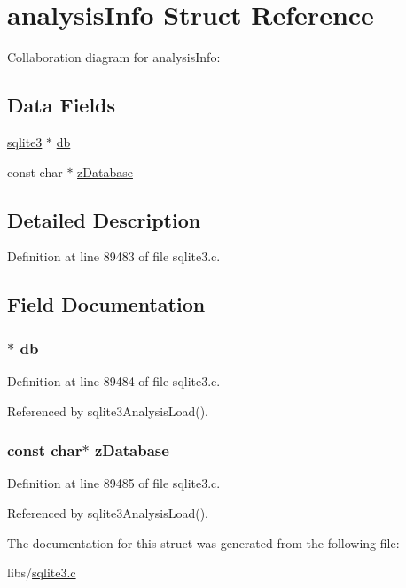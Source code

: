 \hypertarget{structanalysis_info}{}\section{analysis\+Info Struct Reference}
\label{structanalysis_info}


Collaboration diagram for analysis\+Info\+:
\subsection*{Data Fields}
\begin{DoxyCompactItemize}
\item 
\hyperlink{structsqlite3}{sqlite3} $\ast$ \hyperlink{structanalysis_info_ad6e663497d2c934364b3bcf07496b30b}{db}
\item 
const char $\ast$ \hyperlink{structanalysis_info_a40b092a9a3228020178e32c8c3bffdf5}{z\+Database}
\end{DoxyCompactItemize}


\subsection{Detailed Description}


Definition at line 89483 of file sqlite3.\+c.



\subsection{Field Documentation}
\hypertarget{structanalysis_info_ad6e663497d2c934364b3bcf07496b30b}{}
\subsubsection[{db}]{$\ast$ db}\label{structanalysis_info_ad6e663497d2c934364b3bcf07496b30b}


Definition at line 89484 of file sqlite3.\+c.



Referenced by sqlite3\+Analysis\+Load().

\hypertarget{structanalysis_info_a40b092a9a3228020178e32c8c3bffdf5}{}
\subsubsection[{z\+Database}]{\setlength{\rightskip}{0pt plus 5cm}const char$\ast$ z\+Database}\label{structanalysis_info_a40b092a9a3228020178e32c8c3bffdf5}


Definition at line 89485 of file sqlite3.\+c.



Referenced by sqlite3\+Analysis\+Load().



The documentation for this struct was generated from the following file\+:\begin{DoxyCompactItemize}
\item 
libs/\hyperlink{sqlite3_8c}{sqlite3.\+c}\end{DoxyCompactItemize}
